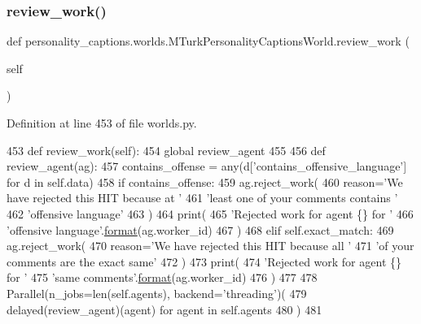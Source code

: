 \subsubsection{\texorpdfstring{review\+\_\+work()}{review\_work()}}
{\footnotesize\ttfamily def personality\+\_\+captions.\+worlds.\+M\+Turk\+Personality\+Captions\+World.\+review\+\_\+work (\begin{DoxyParamCaption}\item[{}]{self }\end{DoxyParamCaption})}



Definition at line 453 of file worlds.\+py.


\begin{DoxyCode}
453     \textcolor{keyword}{def }review\_work(self):
454         \textcolor{keyword}{global} review\_agent
455 
456         \textcolor{keyword}{def }review\_agent(ag):
457             contains\_offense = any(d[\textcolor{stringliteral}{'contains\_offensive\_language'}] \textcolor{keywordflow}{for} d \textcolor{keywordflow}{in} self.data)
458             \textcolor{keywordflow}{if} contains\_offense:
459                 ag.reject\_work(
460                     reason=\textcolor{stringliteral}{'We have rejected this HIT because at '}
461                     \textcolor{stringliteral}{'least one of your comments contains '}
462                     \textcolor{stringliteral}{'offensive language'}
463                 )
464                 print(
465                     \textcolor{stringliteral}{'Rejected work for agent \{\} for '}
466                     \textcolor{stringliteral}{'offensive language'}.\hyperlink{namespaceparlai_1_1chat__service_1_1services_1_1messenger_1_1shared__utils_a32e2e2022b824fbaf80c747160b52a76}{format}(ag.worker\_id)
467                 )
468             \textcolor{keywordflow}{elif} self.exact\_match:
469                 ag.reject\_work(
470                     reason=\textcolor{stringliteral}{'We have rejected this HIT because all '}
471                     \textcolor{stringliteral}{'of your comments are the exact same'}
472                 )
473                 print(
474                     \textcolor{stringliteral}{'Rejected work for agent \{\} for '}
475                     \textcolor{stringliteral}{'same comments'}.\hyperlink{namespaceparlai_1_1chat__service_1_1services_1_1messenger_1_1shared__utils_a32e2e2022b824fbaf80c747160b52a76}{format}(ag.worker\_id)
476                 )
477 
478         Parallel(n\_jobs=len(self.agents), backend=\textcolor{stringliteral}{'threading'})(
479             delayed(review\_agent)(agent) \textcolor{keywordflow}{for} agent \textcolor{keywordflow}{in} self.agents
480         )
481 
\end{DoxyCode}
